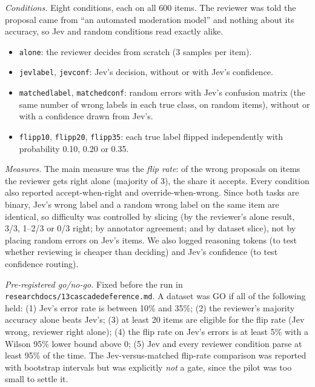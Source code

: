 \documentclass[11pt]{article}
\renewcommand{\_}{\origunderscore\allowbreak}
\begin{document}
\emph{Conditions.} Eight conditions, each on all 600 items. The reviewer was told the proposal came from ``an automated moderation model'' and nothing about its accuracy, so Jev and random conditions read exactly alike.
\begin{itemize}[nosep]
  \item \texttt{alone}: the reviewer decides from scratch (3 samples per item).
  \item \texttt{jev\_label}, \texttt{jev\_conf}: Jev's decision, without or with Jev's confidence.
  \item \texttt{matched\_label}, \texttt{matched\_conf}: random errors with Jev's confusion matrix (the same number of wrong labels in each true class, on random items), without or with a confidence drawn from Jev's.
  \item \texttt{flip\_p10}, \texttt{flip\_p20}, \texttt{flip\_p35}: each true label flipped independently with probability 0.10, 0.20 or 0.35.
\end{itemize}
\emph{Measures.} The main measure was the \emph{flip rate}: of the wrong proposals on items the reviewer gets right alone (majority of 3), the share it accepts. Every condition also reported accept-when-right and override-when-wrong. Since both tasks are binary, Jev's wrong label and a random wrong label on the same item are identical, so difficulty was controlled by slicing (by the reviewer's alone result, 3/3, 1--2/3 or 0/3 right; by annotator agreement; and by dataset slice), not by placing random errors on Jev's items. We also logged reasoning tokens (to test whether reviewing is cheaper than deciding) and Jev's confidence (to test confidence routing).

\emph{Pre-registered go/no-go.} Fixed before the run in \texttt{research\_docs/13\_cascade\_deference.md}. A dataset was GO if all of the following held: (1) Jev's error rate is between 10\% and 35\%; (2) the reviewer's majority accuracy alone beats Jev's; (3) at least 20 items are eligible for the flip rate (Jev wrong, reviewer right alone); (4) the flip rate on Jev's errors is at least 5\% with a Wilson 95\% lower bound above 0; (5) Jev and every reviewer condition parse at least 95\% of the time. The Jev-versus-matched flip-rate comparison was reported with bootstrap intervals but was explicitly \emph{not} a gate, since the pilot was too small to settle it.
\end{document}
